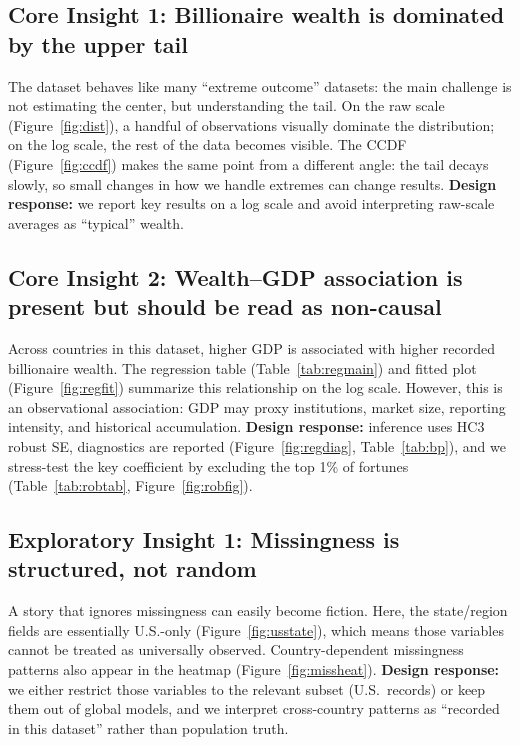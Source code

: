 \documentclass[a4paper,10pt]{article}
\begin{document}
\subsection{Core Insight 1: Billionaire wealth is dominated by the upper tail}

The dataset behaves like many ``extreme outcome'' datasets: the main challenge is not estimating the center, but understanding the tail.
On the raw scale (Figure~\ref{fig:dist}), a handful of observations visually dominate the distribution; on the log scale, the rest of the data becomes visible.
The CCDF (Figure~\ref{fig:ccdf}) makes the same point from a different angle: the tail decays slowly, so small changes in how we handle extremes can change results.
\textbf{Design response:} we report key results on a log scale and avoid interpreting raw-scale averages as ``typical'' wealth.

\subsection{Core Insight 2: Wealth--GDP association is present but should be read as non-causal}

Across countries in this dataset, higher GDP is associated with higher recorded billionaire wealth.
The regression table (Table~\ref{tab:regmain}) and fitted plot (Figure~\ref{fig:regfit}) summarize this relationship on the log scale.
However, this is an observational association: GDP may proxy institutions, market size, reporting intensity, and historical accumulation.
\textbf{Design response:} inference uses HC3 robust SE, diagnostics are reported (Figure~\ref{fig:regdiag}, Table~\ref{tab:bp}), and we stress-test the key coefficient by excluding the top 1\% of fortunes (Table~\ref{tab:robtab}, Figure~\ref{fig:robfig}).

\subsection{Exploratory Insight 1: Missingness is structured, not random}

A story that ignores missingness can easily become fiction.
Here, the state/region fields are essentially U.S.-only (Figure~\ref{fig:usstate}), which means those variables cannot be treated as universally observed.
Country-dependent missingness patterns also appear in the heatmap (Figure~\ref{fig:missheat}).
\textbf{Design response:} we either restrict those variables to the relevant subset (U.S.\ records) or keep them out of global models, and we interpret cross-country patterns as ``recorded in this dataset'' rather than population truth.
\end{document}
